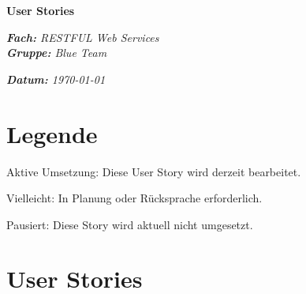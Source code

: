 \documentclass[12pt,a4paper]{article}
\newcommand{\doing}[1]{\textbf{{#1}}}
\newcommand{\maybe}[1]{\textit{\textcolor{MaybeColor}{#1}}}
\newcommand{\notdoing}[1]{\textcolor{NotDoingColor}{#1}}
\begin{document}
\noindent
{\fontsize{24}{28}\selectfont\bfseries User Stories} \\
\begin{minipage}[t]{0.7\textwidth}
  \vspace{8pt}
  {\itshape \textbf{Fach:} RESTFUL Web Services} \\
  {\itshape \textbf{Gruppe:} Blue Team}
\end{minipage}
\begin{minipage}[t]{0.3\textwidth}
  \flushright
  \vspace{8pt}
  \itshape \textbf{Datum:} \today
\end{minipage}

\section*{Legende}
\begin{description}[style=multiline, leftmargin=3cm]
  \item[\doing{Fett/Schwarz}] Aktive Umsetzung: Diese User Story wird
    derzeit bearbeitet.
  \item[\maybe{Kursiv/Rot}] Vielleicht: In Planung oder Rücksprache
    erforderlich.
  \item[\notdoing{Grau}] Pausiert: Diese Story wird aktuell nicht umgesetzt.
\end{description}

\section{User Stories}
\end{document}

